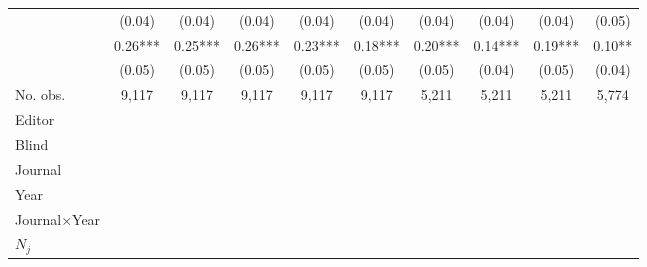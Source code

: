\begin{table}
\begin{threeparttable}
\begin{tabular}{p{3cm}S@{}S@{}S@{}S@{}S@{}S@{}S@{}S@{}S@{}}
                                          &      (0.04)   &      (0.04)   &      (0.04)   &      (0.04)   &      (0.04)   &      (0.04)   &      (0.04)   &      (0.04)   &      (0.05)   \\
               &        0.26***&        0.25***&        0.26***&        0.23***&        0.18***&        0.20***&        0.14***&        0.19***&        0.10** \\
                                          &      (0.05)   &      (0.05)   &      (0.05)   &      (0.05)   &      (0.05)   &      (0.05)   &      (0.04)   &      (0.05)   &      (0.04)   \\
            \midrule
            No. obs.                      &       9,117   &       9,117   &       9,117   &       9,117   &       9,117   &       5,211   &       5,211   &       5,211   &       5,774   \\
            \midrule
            Editor               &           {}   &           {}   &           {}   &           {}   &           {}   &           {}   &           {}   &           {}   &           {}   \\
            Blind                         &           {}   &           {}   &           {}   &           {}   &           {}   &           {}   &           {}   &           {}   &           {}   \\
            Journal                       &           {}   &           {}   &               &               &               &               &               &               &               \\
            Year                          &               &           {}   &               &               &               &               &               &               &               \\
            Journal\(\times\)Year                  &               &               &           {}   &           {}   &           {}   &           {}   &           {}   &           {}   &           {}   \\
            \(N_j\)                       &               &               &               &           {}   &           {}   &           {}   &           {}   &           {}   &           {}   \\

\end{tabular}
\end{threeparttable}
\end{table}

